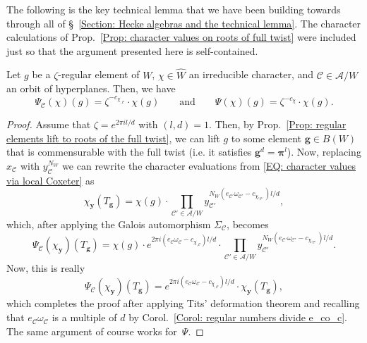 The following is the key technical lemma that we have been building towards through all of \S~\ref{Section: Hecke algebras and the technical lemma}. The character calculations of Prop.~\ref{Prop: character values on roots of full twist} were included just so that the argument presented here is self-contained.

\begin{prop}\label{Prop: The key technical lemma}
Let $g$ be a $\zeta$-regular element of $W$, $\chi\in\widehat{W}$ an irreducible character, and $\mathcal{C}\in\mathcal{A}/W$ an orbit of hyperplanes. Then, we have $$\Psi_{\mathcal{C}}(\chi)(g)= \zeta^{-c_{\chi_{,\mathcal{C}}}}\cdot\chi(g) \quad \quad\text{and}\quad\quad\Psi(\chi)(g)= \zeta^{-c_{\chi}}\cdot \chi(g).$$
\end{prop}
\begin{proof}
Assume that $\zeta=e^{2\pi il/d}$ with $(l,d)=1$. Then, by Prop.~\ref{Prop: regular elements lift to roots of the full twist}, we can lift  $g$ to some element $\bm g\in B(W)$ that is commensurable with the full twist (i.e. it satisfies $\bm g^d=\bm \pi^l$). Now, replacing $x_\mathcal{C}$ with $y_{\mathcal{C}}^{N_W}$ we can rewrite the character evaluations from \eqref{EQ: character values via local Coxeter} as $$\chi_{\bm y}(T_{\bm g})=\chi(g)\cdot\prod_{\mathcal{C}'\in\mathcal{A}/W}y_{\mathcal{C}'}^{N_W(e_{\mathcal{C}'}\omega_{\mathcal{C}'}-c_{\chi,_{\mathcal{C}'}})l/d}, $$
which, after applying the Galois automorphism $\Sigma_{\mathcal{C}}$, becomes
$$ \Psi_{\mathcal{C}}(\chi_{\bm y})(T_{\bm g})= \chi(g)\cdot e^{2\pi i(e_{\mathcal{C}}\omega_{\mathcal{C}}-c_{\chi_{,\mathcal{C}}})l/d }\cdot \prod_{\mathcal{C}'\in\mathcal{A}/W}y_{\mathcal{C}'}^{N_W(e_{\mathcal{C}'}\omega_{\mathcal{C}'}-c_{\chi,_{\mathcal{C}'}})l/d}. $$ 
Now, this is really 
$$ \Psi_{\mathcal{C}}(\chi_{\bm y})(T_{\bm g})=e^{2\pi i(e_{\mathcal{C}}\omega_{\mathcal{C}}-c_{\chi_{,\mathcal{C}}})l/d }\cdot\chi_{\bm y}(T_{\bm g}),$$ which completes the proof after applying Tits' deformation theorem and recalling that $e_{\mathcal{C}}\omega_{\mathcal{C}}$ is a multiple of $d$ by Corol.~\ref{Corol: regular numbers divide e_co_c}. The same argument of course works for~$\Psi$.
\end{proof}
